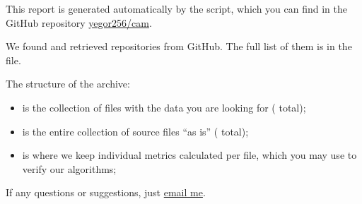 \documentclass[nobrand,anonymous,nosecurity]{huawei}
\begin{document}
\maketitle

This report is generated automatically by the script, which you can find in
the GitHub repository \href{https://github.com/yegor256/cam}{yegor256/cam}.

We found and retrieved 
repositories from GitHub.
The full list of them is in the  file.


The structure of the archive:

\begin{itemize}
  \item {} is the collection of  files with the data
  you are looking for ( total);

  \item {} is the entire collection of source files ``as is''
  ( total);

  \item {} is where we keep individual metrics calculated
  per file, which you may use to verify our algorithms;
\end{itemize}

If any questions or suggestions, just \href{mailto:yegor256@gmail.com}{email me}.
\end{document}
